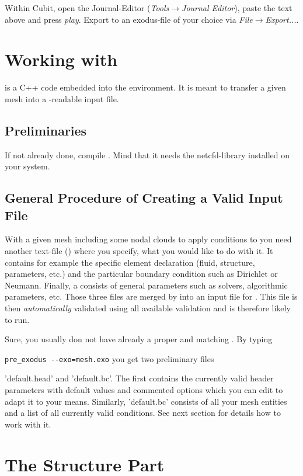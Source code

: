 Within Cubit, open the Journal-Editor (\emph{Tools}$\to$\emph{Journal
Editor}), paste the text above and press \emph{play}. Export to an
exodus-file of your choice via \emph{File}$\to$\emph{Export...}.

\section{Working with \prexo}

\prexo is a C++ code embedded into the \baci{} environment. It is meant to
transfer a given mesh into a \baci{}-readable input file.

\subsection{Preliminaries}

If not already done, compile \prexo. Mind that it needs the netcfd-library
installed on your system.

\subsection{General Procedure of Creating a Valid \baci{} Input File}
With a given mesh including some nodal clouds to apply conditions to you need
another text-file (\bc) where you specify, what you would like to do with
it. It contains for example the specific element declaration (fluid, structure,
parameters, etc.) and the particular boundary condition such as Dirichlet or
Neumann. Finally, a \head consists of general parameters such as
solvers, algorithmic parameters, etc. Those three files are merged by \prexo
into an input file for \baci{}. This file is then \emph{automatically} validated
using all available \baci{} validation and is therefore likely to run.

Sure, you usually don not have already a proper \head and matching \bc. By
typing

\verb|pre_exodus --exo=mesh.exo| you get two preliminary files

'default.head' and 'default.bc'. The first contains the currently valid header
parameters with default values and commented options which you can edit to
adapt it to your means. Similarly, 'default.bc' consists of all your mesh
entities and a list of all currently valid conditions. See next section for
details how to work with it.

\section{The Structure Part}

